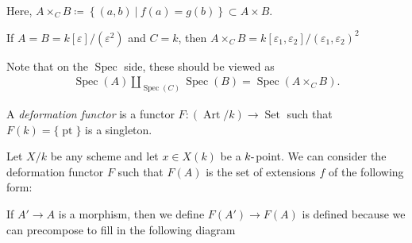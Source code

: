 Here,
\(A \times_C B \coloneqq\left\{{(a, b) {~\mathrel{\Big|}~}f(a) = g(b)}\right\} \subset A\times B\).

\begin{description}
\tightlist
\item[Example]
If \(A = B = k[\varepsilon]/(\varepsilon^2)\) and \(C = k\), then
\(A\times_C B = k[\varepsilon_1, \varepsilon_2]/(\varepsilon_1, \varepsilon_2)^2\)
\end{description}

Note that on the \(\operatorname{Spec}\) side, these should be viewed as
\begin{align*}
\operatorname{Spec}(A) {\coprod}_{\operatorname{Spec}(C)} \operatorname{Spec}(B) = \operatorname{Spec}(A\times_C B)
.\end{align*}

\begin{description}
\tightlist
\item[Definition (Deformation Functor (loose definition))]
A \emph{deformation functor} is a functor
\(F: (\operatorname{Art}/k) \to {\operatorname{Set}}\) such that
\(F(k) = {\{\operatorname{pt}\}}\) is a singleton.
\item[Example]
Let \(X/k\) be any scheme and let \(x\in X(k)\) be a
\(k{\hbox{-}}\)point. We can consider the deformation functor \(F\) such
that \(F(A)\) is the set of extensions \(f\) of the following form:
\end{description}

\begin{center}
  \end{center}

If \(A' \to A\) is a morphism, then we define \(F(A') \to F(A)\) is
defined because we can precompose to fill in the following diagram

